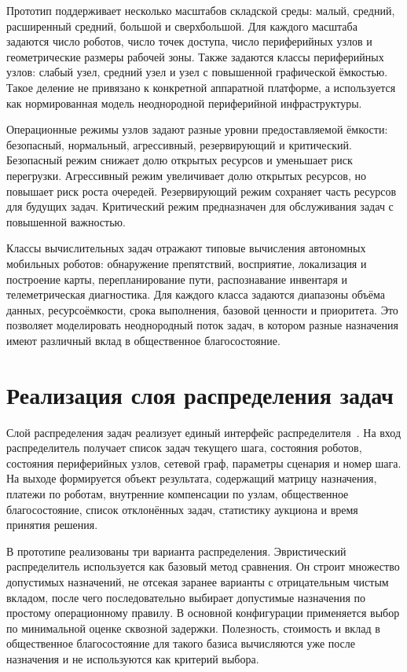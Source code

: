 Прототип поддерживает несколько масштабов складской среды: малый, средний, расширенный средний, большой и сверхбольшой. Для каждого масштаба задаются число роботов, число точек доступа, число периферийных узлов и геометрические размеры рабочей зоны. Также задаются классы периферийных узлов: слабый узел, средний узел и узел с повышенной графической ёмкостью. Такое деление не привязано к конкретной аппаратной платформе, а используется как нормированная модель неоднородной периферийной инфраструктуры.

Операционные режимы узлов задают разные уровни предоставляемой ёмкости: безопасный, нормальный, агрессивный, резервирующий и критический. Безопасный режим снижает долю открытых ресурсов и уменьшает риск перегрузки. Агрессивный режим увеличивает долю открытых ресурсов, но повышает риск роста очередей. Резервирующий режим сохраняет часть ресурсов для будущих задач. Критический режим предназначен для обслуживания задач с повышенной важностью.

Классы вычислительных задач отражают типовые вычисления автономных мобильных роботов: обнаружение препятствий, восприятие, локализация и построение карты, перепланирование пути, распознавание инвентаря и телеметрическая диагностика. Для каждого класса задаются диапазоны объёма данных, ресурсоёмкости, срока выполнения, базовой ценности и приоритета. Это позволяет моделировать неоднородный поток задач, в котором разные назначения имеют различный вклад в общественное благосостояние.

\section{Реализация слоя распределения задач}

Слой распределения задач реализует единый интерфейс распределителя~\cite{patent_ma_vcg}. На вход распределитель получает список задач текущего шага, состояния роботов, состояния периферийных узлов, сетевой граф, параметры сценария и номер шага. На выходе формируется объект результата, содержащий матрицу назначения, платежи по роботам, внутренние компенсации по узлам, общественное благосостояние, список отклонённых задач, статистику аукциона и время принятия решения.

В прототипе реализованы три варианта распределения. Эвристический распределитель используется как базовый метод сравнения. Он строит множество допустимых назначений, не отсекая заранее варианты с отрицательным чистым вкладом, после чего последовательно выбирает допустимые назначения по простому операционному правилу. В основной конфигурации применяется выбор по минимальной оценке сквозной задержки. Полезность, стоимость и вклад в общественное благосостояние для такого базиса вычисляются уже после назначения и не используются как критерий выбора.

